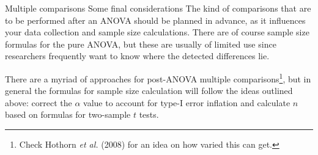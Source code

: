 %
%
\begin{frame}
{Multiple comparisons}
{Some final considerations}
The kind of comparisons that are to be performed after an ANOVA should be planned in advance, as it influences your data collection and sample size calculations. There are of course sample size formulas for the pure ANOVA, but these are usually of limited use since researchers frequently want to know where the detected differences lie.
\bigskip

There are a myriad of approaches for post-ANOVA multiple comparisons\footnote[5]{\tiny Check Hothorn \textit{et al.} (2008) for an idea on how varied this can get.}, but in general the formulas for sample size calculation will follow the ideas outlined above: correct the $\alpha$ value to account for type-I error inflation and calculate $n$ based on formulas for two-sample $t$ tests.
\end{frame}
%











